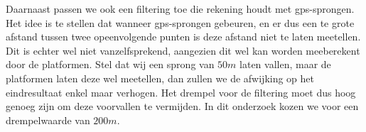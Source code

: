 Daarnaast passen we ook een filtering toe die rekening houdt met
\ac{gps}-sprongen. Het idee is te stellen dat wanneer \ac{gps}-sprongen
gebeuren, en er dus een te grote afstand tussen twee opeenvolgende punten is
deze afstand niet te laten meetellen. Dit is echter wel niet vanzelfsprekend,
aangezien dit wel kan worden meeberekent door de platformen. Stel dat wij een
sprong van $50m$ laten vallen, maar de platformen laten deze wel meetellen, dan
zullen we de afwijking op het eindresultaat enkel maar verhogen. Het drempel
voor de filtering moet dus hoog genoeg zijn om deze voorvallen te vermijden. In
dit onderzoek kozen we voor een drempelwaarde van $200m$.

